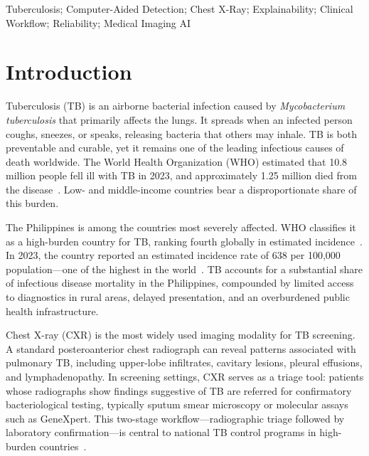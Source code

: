 \documentclass[conference, letterpaper]{IEEEtran}
\begin{document}
\begin{IEEEkeywords}
Tuberculosis; Computer-Aided Detection; Chest X-Ray; Explainability; Clinical Workflow; Reliability; Medical Imaging AI
\end{IEEEkeywords}

\IEEEpeerreviewmaketitle

\section{Introduction}

Tuberculosis (TB) is an airborne bacterial infection caused by \textit{Mycobacterium tuberculosis} that primarily affects the lungs. It spreads when an infected person coughs, sneezes, or speaks, releasing bacteria that others may inhale. TB is both preventable and curable, yet it remains one of the leading infectious causes of death worldwide. The World Health Organization (WHO) estimated that 10.8 million people fell ill with TB in 2023, and approximately 1.25 million died from the disease~\cite{who_global_tb_2024}. Low- and middle-income countries bear a disproportionate share of this burden.

The Philippines is among the countries most severely affected. WHO classifies it as a high-burden country for TB, ranking fourth globally in estimated incidence~\cite{who_global_tb_2024}. In 2023, the country reported an estimated incidence rate of 638 per 100,000 population---one of the highest in the world~\cite{who_ph_profile_2024}. TB accounts for a substantial share of infectious disease mortality in the Philippines, compounded by limited access to diagnostics in rural areas, delayed presentation, and an overburdened public health infrastructure.

Chest X-ray (CXR) is the most widely used imaging modality for TB screening. A standard posteroanterior chest radiograph can reveal patterns associated with pulmonary TB, including upper-lobe infiltrates, cavitary lesions, pleural effusions, and lymphadenopathy. In screening settings, CXR serves as a triage tool: patients whose radiographs show findings suggestive of TB are referred for confirmatory bacteriological testing, typically sputum smear microscopy or molecular assays such as GeneXpert. This two-stage workflow---radiographic triage followed by laboratory confirmation---is central to national TB control programs in high-burden countries~\cite{who_screening_2021}.
\end{document}
